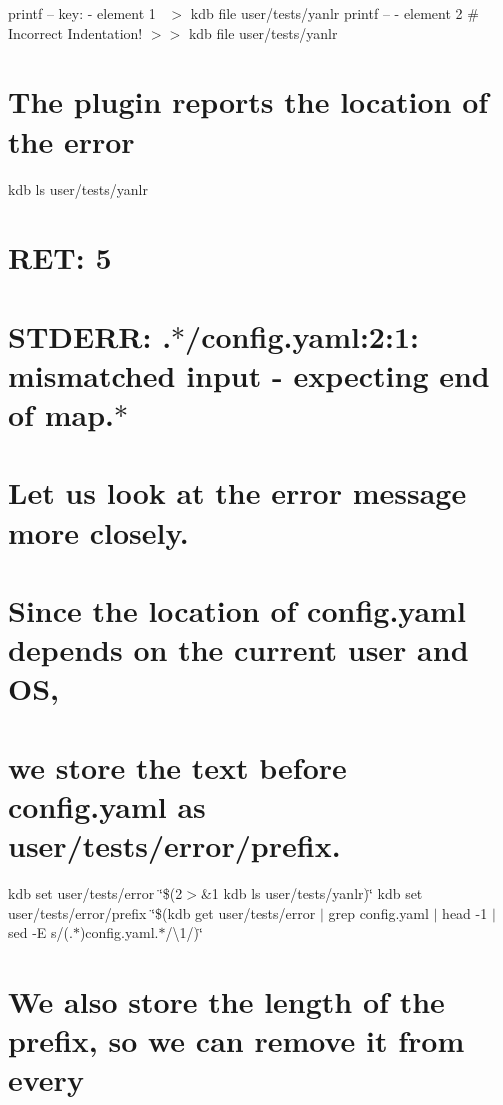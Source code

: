 printf -- \textquotesingle{}key\+: -\/ element 1~\newline
\textquotesingle{} $>$ {\ttfamily kdb file user/tests/yanlr} printf -- \textquotesingle{}-\/ element 2 \# Incorrect Indentation!\textquotesingle{} $>$$>$ {\ttfamily kdb file user/tests/yanlr}

\section*{The plugin reports the location of the error}

kdb ls user/tests/yanlr \section*{R\+ET\+: 5}

\section*{S\+T\+D\+E\+RR\+: .$\ast$/config.yaml\+:2\+:1\+: mismatched input \textquotesingle{}-\/ \textquotesingle{} expecting end of map.$\ast$}

\section*{Let us look at the error message more closely.}

\section*{Since the location of {\ttfamily config.\+yaml} depends on the current user and OS,}

\section*{we store the text before {\ttfamily config.\+yaml} as {\ttfamily user/tests/error/prefix}.}

kdb set user/tests/error \char`\"{}\$(2$>$\&1 kdb ls user/tests/yanlr)\char`\"{} kdb set user/tests/error/prefix \char`\"{}\$(kdb get user/tests/error $\vert$ grep \textquotesingle{}config.\+yaml\textquotesingle{} $\vert$ head -\/1 $\vert$ sed -\/\+E \textquotesingle{}s/(.$\ast$)config.\+yaml.$\ast$/\textbackslash{}1/\textquotesingle{})\char`\"{} \section*{We also store the length of the prefix, so we can remove it from every}

